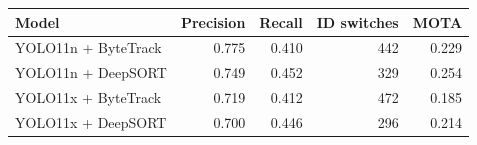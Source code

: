 \begin{tabular}{lrrrr}
\toprule
Model & Precision & Recall & ID switches & MOTA \\
\midrule
YOLO11n + ByteTrack & 0.775 & 0.410 & 442 & 0.229 \\
YOLO11n + DeepSORT & 0.749 & 0.452 & 329 & 0.254 \\
YOLO11x + ByteTrack & 0.719 & 0.412 & 472 & 0.185 \\
YOLO11x + DeepSORT & 0.700 & 0.446 & 296 & 0.214 \\
\bottomrule
\end{tabular}
